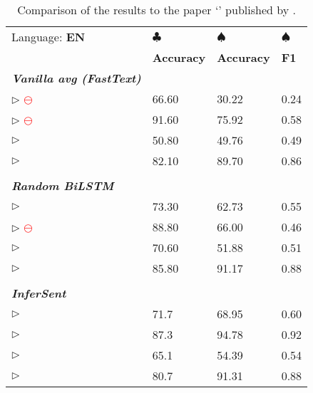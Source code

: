 \begin{table}[h]
	\centering
	\renewcommand{\arraystretch}{1.1}
	\begin{tabularx}{\textwidth}{| X Y | Y Y |}
		\hline
		Language: \textbf{EN}										&
		\textbf{$\clubsuit$} 											&
		\textbf{$\spadesuit$}					 						&
		\textbf{$\spadesuit$}											\\
					 												&
		\textbf{Accuracy} 											&
		\textbf{Accuracy} 											&
		\textbf{F1} 													\\
		\textbf{\textit{Vanilla avg (FastText)}} & & &				 	\\
		\hline
		$\triangleright$  \textcolor{red}{$\ominus$}
								&	66.60	&	30.22	&	0.24	\\
		$\triangleright$  \textcolor{red}{$\ominus$}
								&	91.60	&	75.92	&	0.58	\\
		$\triangleright$ 	
								&	50.80	&	49.76	&	0.49	\\
		$\triangleright$ 	
								&	82.10	&	89.70	&	0.86	\\
		& & &														\\
		\textbf{\textit{Random BiLSTM}} & & &							\\
		\hline
		$\triangleright$ 	
								&	73.30	&	62.73	&	0.55	\\
		$\triangleright$  \textcolor{red}{$\ominus$}
								&	88.80	&	66.00	&	0.46	\\
		$\triangleright$ 	
								&	70.60	&	51.88	&	0.51	\\
		$\triangleright$ 	
								&	85.80	&	91.17	&	0.88	\\
		& & &														\\
		\textbf{\textit{InferSent}} & & &								\\
		\hline
		$\triangleright$ 	
								&	71.7	&	68.95	&	0.60	\\
		$\triangleright$ 
								&	87.3	&	94.78	&	0.92	\\
		$\triangleright$ 	
								&	65.1	&	54.39	&	0.54	\\
		$\triangleright$ 	
								&	80.7	&	91.31	&	0.88	\\
		\hline
	\end{tabularx}
	\caption[Comparison with the results of Conneau et al.]
		{Comparison of the results to the paper `' 
			published by \citep{Conneau.2018a}.}
	\label{tab:comparison_conneau}
\end{table}